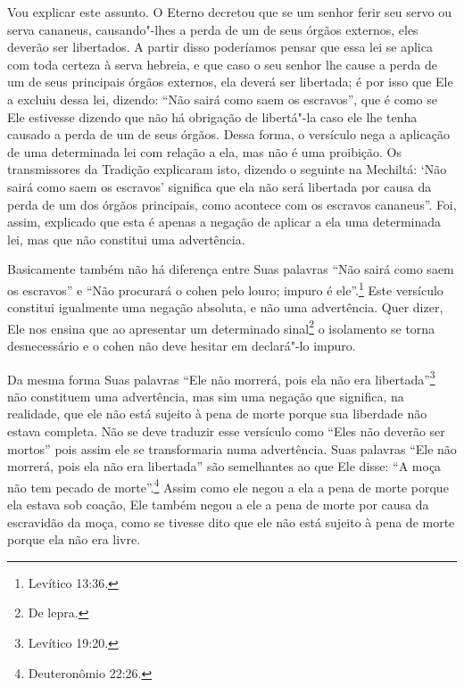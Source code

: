 Vou explicar este assunto. O Eterno decretou que se um senhor ferir seu
servo ou serva cananeus, causando"-lhes a perda de um de seus órgãos
externos, eles deverão ser libertados. A partir disso poderíamos pensar
que essa lei se aplica com toda certeza à serva hebreia, e que caso o
seu senhor lhe cause a perda de um de seus principais órgãos externos,
ela deverá ser libertada; é por isso que Ele a excluiu dessa lei,
dizendo: ``Não sairá como saem os escravos'', que é como se Ele
estivesse dizendo que não há obrigação de libertá"-la caso ele lhe tenha
causado a perda de um de seus órgãos. Dessa forma, o versículo nega a
aplicação de uma determinada lei com relação a ela, mas não é uma
proibição. Os transmissores da Tradição explicaram isto, dizendo o
seguinte na Mechiltá\starr: `Não sairá como saem os escravos' significa que
ela não será libertada por causa da perda de um dos órgãos principais,
como acontece com os escravos cananeus''. Foi, assim, explicado que esta
é apenas a negação de aplicar a ela uma determinada lei, mas que não
constitui uma advertência.

Basicamente também não há diferença entre Suas palavras ``Não sairá como saem os escravos'' e ``Não procurará o cohen\starr{} pelo louro;
impuro
é ele''.\footnote{Levítico 13:36.} Este versículo constitui igualmente uma
negação absoluta, e não uma advertência. Quer dizer, Ele nos ensina que ao
apresentar um determinado sinal\footnote{De lepra.} o isolamento se
torna desnecessário e o cohen\starr{} não deve hesitar em declará"-lo impuro.

Da mesma forma Suas palavras ``Ele não morrerá, pois ela não era
libertada''\footnote{Levítico 19:20.} não constituem uma advertência, mas sim uma
negação que significa, na realidade, que ele não está sujeito à pena de
morte porque sua liberdade não estava completa. Não se deve traduzir
esse versículo como ``Eles não deverão ser mortos'' pois assim ele se
transformaria numa advertência. Suas palavras ``Ele não morrerá, pois
ela não era libertada'' são semelhantes ao que Ele disse: ``A moça não tem pecado de morte''.\footnote{Deuteronômio 22:26.} Assim como ele negou a ela a pena de morte porque
ela estava sob coação, Ele também negou a ele a pena de morte por causa
da escravidão da moça, como se tivesse dito que ele não está sujeito à
pena de morte porque ela não era livre.


